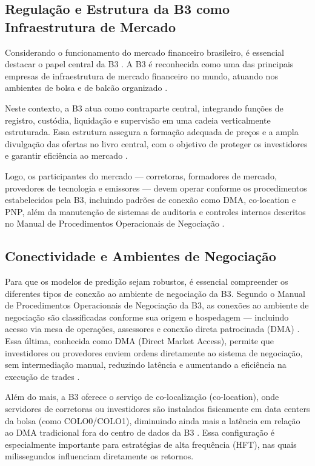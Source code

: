 \subsection{Regulação e Estrutura da B3 como Infraestrutura de Mercado}

Considerando o funcionamento do mercado financeiro brasileiro, é essencial destacar o papel central da B3 \cite{b3_quem_somos}. A B3 é reconhecida como uma das principais empresas de infraestrutura de mercado financeiro no mundo, atuando nos ambientes de bolsa e de balcão organizado \cite{b3_quem_somos}.

Neste contexto, a B3 atua como contraparte central, integrando funções de registro, custódia, liquidação e supervisão em uma cadeia verticalmente estruturada. Essa estrutura assegura a formação adequada de preços e a ampla divulgação das ofertas no livro central, com o objetivo de proteger os investidores e garantir eficiência ao mercado \cite{b3_servicos,b3_quem_somos}.

Logo, os participantes do mercado — corretoras, formadores de mercado, provedores de tecnologia e emissores — devem operar conforme os procedimentos estabelecidos pela B3, incluindo padrões de conexão como DMA, co-location e PNP, além da manutenção de sistemas de auditoria e controles internos descritos no Manual de Procedimentos Operacionais de Negociação \cite{b3_manual_negociacao}.




\subsection{Conectividade e Ambientes de Negociação}

Para que os modelos de predição sejam robustos, é essencial compreender os diferentes tipos de conexão ao ambiente de negociação da B3. Segundo o Manual de Procedimentos Operacionais de Negociação da B3, as conexões ao ambiente de negociação são classificadas conforme sua origem e hospedagem — incluindo acesso via mesa de operações, assessores e conexão direta patrocinada (DMA) \cite{b3_manual_negociacao}. Essa última, conhecida como DMA (Direct Market Access), permite que investidores ou provedores enviem ordens diretamente ao sistema de negociação, sem intermediação manual, reduzindo latência e aumentando a eficiência na execução de trades \cite{b3_manual_negociacao}.

Além do mais, a B3 oferece o serviço de co-localização (co-location), onde servidores de corretoras ou investidores são instalados fisicamente em data centers da bolsa (como COLO0/COLO1), diminuindo ainda mais a latência em relação ao DMA tradicional fora do centro de dados da B3 \cite{b3_manual_negociacao}. Essa configuração é especialmente importante para estratégias de alta frequência (HFT), nas quais milissegundos influenciam diretamente os retornos.

